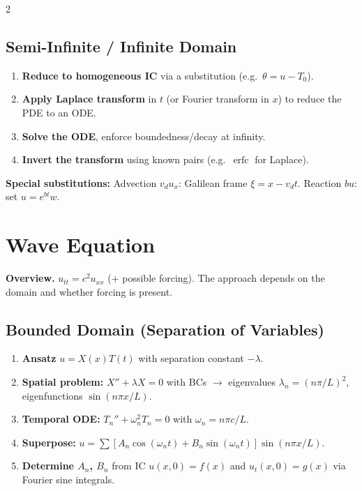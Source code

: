 \documentclass[a4paper,9pt]{article}
\begin{document}
\begin{multicols}{2}
\subsection{Semi-Infinite / Infinite Domain}
\begin{enumerate}
\item \textbf{Reduce to homogeneous IC} via a substitution (e.g.\ $\theta = u - T_0$).
\item \textbf{Apply Laplace transform} in $t$ (or Fourier transform in $x$) to reduce the PDE to an ODE.
\item \textbf{Solve the ODE}, enforce boundedness/decay at infinity.
\item \textbf{Invert the transform} using known pairs (e.g.\ $\operatorname{erfc}$ for Laplace).
\end{enumerate}

\textbf{Special substitutions:}
Advection $v_d u_x$: Galilean frame $\xi=x-v_d t$.
Reaction $bu$: set $u=e^{bt}w$.

\section{Wave Equation}

\textbf{Overview.} $u_{tt}=c^2 u_{xx}$ (+ possible forcing). The approach depends on the domain and whether forcing is present.

\subsection{Bounded Domain (Separation of Variables)}
\begin{enumerate}
\item \textbf{Ansatz} $u=X(x)T(t)$ with separation constant $-\lambda$.
\item \textbf{Spatial problem:} $X''+\lambda X=0$ with BCs $\to$ eigenvalues $\lambda_n=(n\pi/L)^2$, eigenfunctions $\sin(n\pi x/L)$.
\item \textbf{Temporal ODE:} $T_n''+\omega_n^2 T_n = 0$ with $\omega_n = n\pi c/L$.
\item \textbf{Superpose:} $u = \sum [A_n\cos(\omega_n t)+B_n\sin(\omega_n t)]\sin(n\pi x/L)$.
\item \textbf{Determine $A_n$, $B_n$} from IC $u(x,0)=f(x)$ and $u_t(x,0)=g(x)$ via Fourier sine integrals.
\end{enumerate}


\end{multicols}
\end{document}
